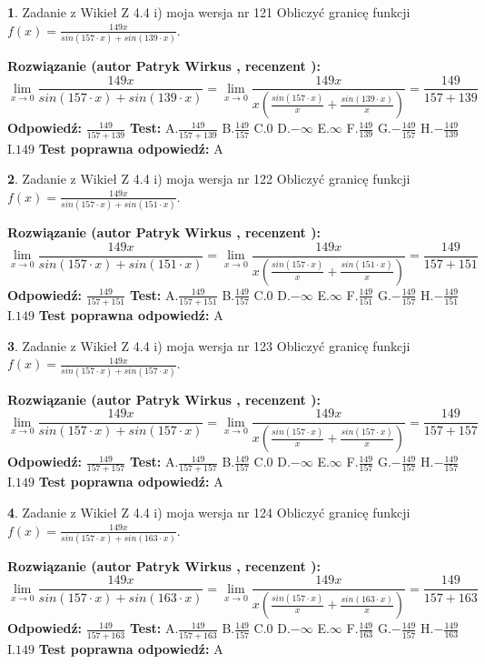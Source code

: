 \documentclass[12pt, a4paper]{article}
\theoremstyle{definition} %
\newtheorem{zad}{}
\newcommand{\zadStart}[1]{\begin{zad}#1\newline}
\newcommand{\zadStop}{\end{zad}}
\newcommand{\rozwStart}[2]{\noindent \textbf{Rozwiązanie (autor #1 , recenzent #2): }\newline}
\newcommand{\rozwStop}{\newline}
\newcommand{\odpStart}{\noindent \textbf{Odpowiedź:}\newline}
\newcommand{\odpStop}{\newline}
\newcommand{\testStart}{\noindent \textbf{Test:}\newline}
\newcommand{\testStop}{\newline}
\newcommand{\kluczStart}{\noindent \textbf{Test poprawna odpowiedź:}\newline}
\newcommand{\kluczStop}{\newline}
\begin{document}
\zadStart{Zadanie z Wikieł Z 4.4 i) moja wersja nr 121}
Obliczyć granicę funkcji $f(x)=\frac{149x}{sin(157\cdot x) +sin(139\cdot x)}$.
\zadStop
\rozwStart{Patryk Wirkus}{}
$$\lim\limits_{x\to 0}\frac{149x}{sin(157\cdot x) +sin(139\cdot x)}=\lim\limits_{x\to 0}\frac{149x}{x(\frac{sin(157\cdot x)}{x}+\frac{sin(139\cdot x)}{x})}=\frac{149}{157+139}$$
\rozwStop
\odpStart
$\frac{149}{157+139}$
\odpStop
\testStart
A.$\frac{149}{157+139}$
B.$\frac{149}{157}$
C.$0$
D.$-\infty$
E.$\infty$
F.$\frac{149}{139}$
G.$-\frac{149}{157}$
H.$-\frac{149}{139}$
I.$149$
\testStop
\kluczStart
A
\kluczStop



\zadStart{Zadanie z Wikieł Z 4.4 i) moja wersja nr 122}
Obliczyć granicę funkcji $f(x)=\frac{149x}{sin(157\cdot x) +sin(151\cdot x)}$.
\zadStop
\rozwStart{Patryk Wirkus}{}
$$\lim\limits_{x\to 0}\frac{149x}{sin(157\cdot x) +sin(151\cdot x)}=\lim\limits_{x\to 0}\frac{149x}{x(\frac{sin(157\cdot x)}{x}+\frac{sin(151\cdot x)}{x})}=\frac{149}{157+151}$$
\rozwStop
\odpStart
$\frac{149}{157+151}$
\odpStop
\testStart
A.$\frac{149}{157+151}$
B.$\frac{149}{157}$
C.$0$
D.$-\infty$
E.$\infty$
F.$\frac{149}{151}$
G.$-\frac{149}{157}$
H.$-\frac{149}{151}$
I.$149$
\testStop
\kluczStart
A
\kluczStop



\zadStart{Zadanie z Wikieł Z 4.4 i) moja wersja nr 123}
Obliczyć granicę funkcji $f(x)=\frac{149x}{sin(157\cdot x) +sin(157\cdot x)}$.
\zadStop
\rozwStart{Patryk Wirkus}{}
$$\lim\limits_{x\to 0}\frac{149x}{sin(157\cdot x) +sin(157\cdot x)}=\lim\limits_{x\to 0}\frac{149x}{x(\frac{sin(157\cdot x)}{x}+\frac{sin(157\cdot x)}{x})}=\frac{149}{157+157}$$
\rozwStop
\odpStart
$\frac{149}{157+157}$
\odpStop
\testStart
A.$\frac{149}{157+157}$
B.$\frac{149}{157}$
C.$0$
D.$-\infty$
E.$\infty$
F.$\frac{149}{157}$
G.$-\frac{149}{157}$
H.$-\frac{149}{157}$
I.$149$
\testStop
\kluczStart
A
\kluczStop



\zadStart{Zadanie z Wikieł Z 4.4 i) moja wersja nr 124}
Obliczyć granicę funkcji $f(x)=\frac{149x}{sin(157\cdot x) +sin(163\cdot x)}$.
\zadStop
\rozwStart{Patryk Wirkus}{}
$$\lim\limits_{x\to 0}\frac{149x}{sin(157\cdot x) +sin(163\cdot x)}=\lim\limits_{x\to 0}\frac{149x}{x(\frac{sin(157\cdot x)}{x}+\frac{sin(163\cdot x)}{x})}=\frac{149}{157+163}$$
\rozwStop
\odpStart
$\frac{149}{157+163}$
\odpStop
\testStart
A.$\frac{149}{157+163}$
B.$\frac{149}{157}$
C.$0$
D.$-\infty$
E.$\infty$
F.$\frac{149}{163}$
G.$-\frac{149}{157}$
H.$-\frac{149}{163}$
I.$149$
\testStop
\kluczStart
A
\kluczStop
\end{document}
